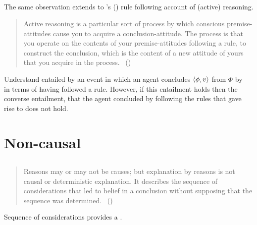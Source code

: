 \subsection{\textcite{Broome:2002aa}}

\begin{note}
  The same observation extends to \citeauthor{Broome:2002aa}'s (\citeyear{Broome:2013aa}) rule following account of (active) reasoning.

  \begin{quote}
    Active reasoning is a particular sort of process by which conscious premise-attitudes cause you to acquire a conclusion-attitude.
    The process is that you operate on the contents of your premise-attitudes following a rule, to construct the conclusion, which is the content of a new attitude of yours that you acquire in the process.\newline
    \mbox{ }\hfill\mbox{(\citeyear[234]{Broome:2002aa})}
  \end{quote}

  Understand  entailed by an event in which an agent concludes \(\langle \phi, v \rangle\) from \(\Phi\) by~\supportI{} in terms of having followed a rule.
  However, if this entailment holds then the converse entailment, that the agent concluded by following the rules that gave rise to  does not hold.
\end{note}

\section{Non-causal}
\label{cha:var:sec:non-causal}

\subsection{\textcite{Harman:1973ww}}

\begin{note}
  \begin{quote}
    Reasons may or may not be causes; but explanation by reasons is not causal or deterministic explanation.
    It describes the sequence of considerations that led to belief in a conclusion without supposing that the sequence was determined.%
    \mbox{ }\hfill\mbox{(\citeyear[52]{Harman:1973ww})}
  \end{quote}

  Sequence of considerations provides a \wit{}.
\end{note}

